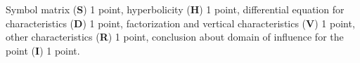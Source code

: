 \begin{bewertung}
Symbol matrix ({\bf S}) 1 point,
hyperbolicity ({\bf H}) 1 point,
differential equation for characteristics ({\bf D}) 1 point,
factorization and vertical characteristics ({\bf V}) 1 point,
other characteristics ({\bf R}) 1 point,
conclusion about domain of influence for the point ({\bf I}) 1 point.
\end{bewertung}
